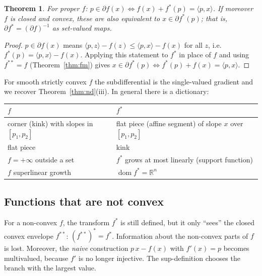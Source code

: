 \documentclass[11pt,a4paper]{article}
\newcommand{\R}{\mathbb{R}}
\newcommand{\ip}[2]{\langle #1,#2\rangle}
\DeclareMathOperator{\dom}{dom}
\theoremstyle{plain}
\newtheorem{theorem}{Theorem}[section]
\theoremstyle{definition}
\theoremstyle{remark}
\begin{document}
\begin{theorem}\label{thm:subdiff}
For proper $f$: $p\in\partial f(x)\iff f(x)+f^*(p)=\ip{p}{x}$.  If moreover $f$
is closed and convex, these are also equivalent to $x\in\partial f^*(p)$;
that is, $\partial f^*=(\partial f)^{-1}$ as set-valued maps.
\end{theorem}

\begin{proof}
$p\in\partial f(x)$ means $\ip{p}{z}-f(z)\le\ip{p}{x}-f(x)$ for all $z$, i.e.
$f^*(p)=\ip{p}{x}-f(x)$.  Applying this statement to $f^*$ in place of $f$ and
using $f^{**}=f$ (Theorem~\ref{thm:fm}) gives $x\in\partial f^*(p)\iff
f^*(p)+f(x)=\ip{p}{x}$.
\end{proof}

For smooth strictly convex $f$ the subdifferential is the single-valued
gradient and we recover Theorem~\ref{thm:nd}(iii).  In general there is a
dictionary:
\begin{center}
\begin{tabular}{@{}ll@{}}
\toprule
$f$ & $f^*$\\
\midrule
corner (kink) with slopes in $[p_1,p_2]$ & flat piece (affine segment) of slope $x$ over $[p_1,p_2]$\\
flat piece & kink\\
$f=+\infty$ outside a set & $f^*$ grows at most linearly (support function)\\
$f$ superlinear growth & $\dom f^*=\R^n$\\
\bottomrule
\end{tabular}
\end{center}

\subsection{Functions that are not convex}

For a non-convex $f$, the transform $f^*$ is still defined, but it only
``sees'' the closed convex envelope $f^{**}$: $(f^{**})^*=f^*$.
Information about the non-convex parts of $f$ is lost.  Moreover, the
\emph{naive} construction $p\,x-f(x)$ with $f'(x)=p$ becomes multivalued,
because $f'$ is no longer injective.  The sup-definition chooses the
branch with the largest value.
\end{document}
